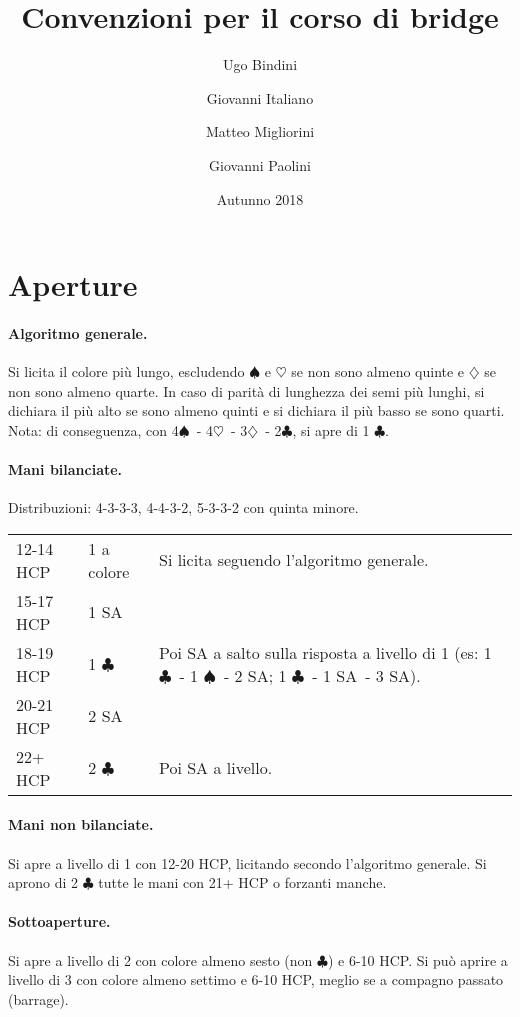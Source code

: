 \documentclass[a4paper,10pt]{article}
\title{Convenzioni per il corso di bridge}
\author{Ugo Bindini \and Giovanni Italiano \and Matteo Migliorini \and Giovanni Paolini}
\date{Autunno 2018}
\renewcommand{\c}{$\clubsuit$\xspace}
\renewcommand{\d}{$\diamondsuit$\xspace}
\newcommand{\h}{$\heartsuit$\xspace}
\newcommand{\s}{$\spadesuit$\xspace}
\newcommand{\sa}{SA\xspace}
\newcommand{\smallspace}{\vskip0.3cm}
\newenvironment{threecol}
  {\smallspace\noindent\begin{tabular}{l l p{0.78\textwidth}}}
  {\end{tabular}\smallspace}
\begin{document}
\maketitle

\section{Aperture}

\paragraph{Algoritmo generale.}
Si licita il colore più lungo, escludendo \s e \h se non sono almeno quinte e \d se non sono almeno quarte.
In caso di parità di lunghezza dei semi più lunghi, si dichiara il più alto se sono almeno quinti e si dichiara il più basso se sono quarti.
Nota: di conseguenza, con 4\s\ - 4\h\ - 3\d\ - 2\c, si apre di 1 \c.

\paragraph{Mani bilanciate.} Distribuzioni: 4-3-3-3, 4-4-3-2, 5-3-3-2 con quinta minore.

\begin{threecol}
 12-14 HCP & 1 a colore & Si licita seguendo l'algoritmo generale.\\
 15-17 HCP & 1 \sa\\
 18-19 HCP & 1 \c & Poi \sa a salto sulla risposta a livello di 1 (es: 1 \c\ - 1 \s\ - 2 \sa; 1 \c\ - 1 \sa\ - 3 \sa).\\
 20-21 HCP & 2 \sa\\
 22+ HCP & 2 \c & Poi \sa a livello.
\end{threecol}

\paragraph{Mani non bilanciate.} Si apre a livello di 1 con 12-20 HCP, licitando secondo l'algoritmo generale. Si aprono di 2 \c tutte le mani con 21+ HCP o forzanti manche.

\paragraph{Sottoaperture.} Si apre a livello di 2 con colore almeno sesto (non \c) e 6-10 HCP. Si può aprire a livello di 3 con colore almeno settimo e 6-10 HCP, meglio se a compagno passato (barrage).
\end{document}
